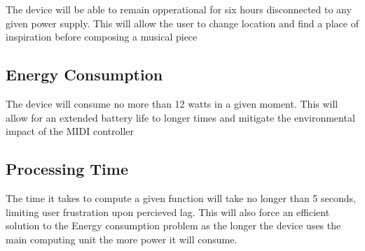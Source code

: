 The device will be able to remain opperational for six hours disconnected to any
given power supply. This will allow the user to change location and find a place
of inspiration before composing a musical piece

\subsection{Energy Consumption}

The device will consume no more than 12 watts in a given moment. This will allow
for an extended battery life to longer times and mitigate the environmental
impact of the MIDI controller

\subsection{Processing Time}

The time it takes to compute a given function will take no longer than 5
seconds, limiting user frustration upon percieved lag. This will also force an
efficient solution to the Energy consumption problem as the longer the device
uses the main computing unit the more power it will consume.
